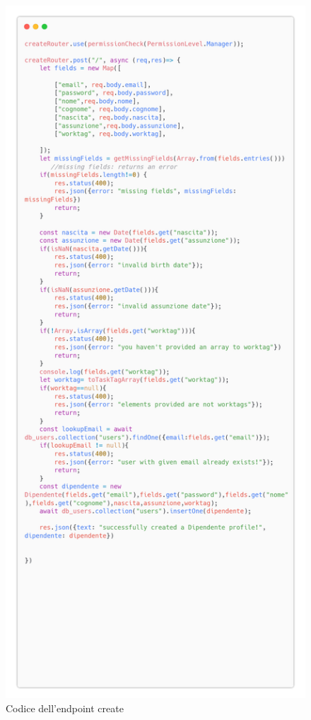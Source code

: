 \documentclass{report}
\begin{document}
\begin{figure}[H]
	\centering\includegraphics[width=1\textwidth]{images/microservizio-dipendenti/create-carbon.png}
	\caption{Codice dell'endpoint create}
\end{figure}
\end{document}
